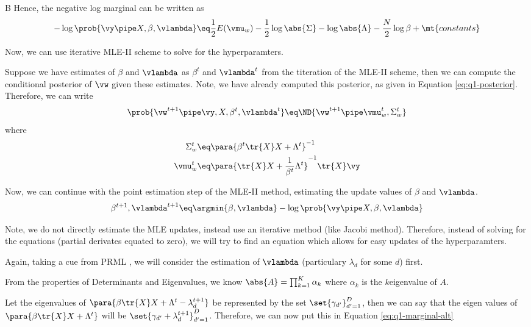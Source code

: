 \documentclass{article}
\begin{document}
\begin{question}
\begin{qpart}{B}
		Hence, the negative log marginal can be written as
		\begin{equation}
			- \log{\prob{\vy \pipe X, \beta, \vlambda}}	\eq	\frac{1}{2}  E(\vmu_w) - \frac{1}{2} \log{\abs{\Sigma}}- \log{\abs{\Lambda}} - \frac{N}{2} \log{\beta} + \mt{constants}
			\label{eq:q1-marginal-alt}
		\end{equation}

		Now, we can use iterative MLE-II scheme to solve for the hyperparamters.

		Suppose we have estimates of $\beta$ and $\vlambda$ as $\beta^t$ and $\vlambda^t$ from the t\tth iteration of the MLE-II scheme, then we can compute the conditional posterior of $\vw$ given these estimates. Note, we have already computed this posterior, as given in Equation \ref{eq:q1-posterior}. Therefore, we can write
		\begin{align*}
			\prob{\vw^{t + 1} \pipe \vy, X, \beta^t, \vlambda^t}	\eq	\ND{\vw^{t + 1} \pipe \vmu_w^t, \Sigma_w^t}
		\end{align*}
		where
		\begin{align*}
			\Sigma_w^t	&\eq	\para{\beta^t \tr{X} X + \Lambda^t}^{-1} \\
			\vmu_w^t	&\eq	\para{\tr{X} X + \frac{1}{\beta^t} \Lambda^t}^{-1} \tr{X} \vy
		\end{align*}

		Now, we can continue with the point estimation step of the MLE-II method, \ie estimating the update values of $\beta$ and $\vlambda$.
		\begin{align*}
			\beta^{t + 1}, \vlambda^{t + 1}	\eq	\argmin{\beta, \vlambda} - \log{\prob{\vy \pipe X, \beta, \vlambda}}
		\end{align*}

		Note, we do not directly estimate the MLE updates, instead use an iterative method (like Jacobi method). Therefore, instead of solving for the equations (partial derivates equated to zero), we will try to find an equation which allows for easy updates of the hyperparamters.

		Again, taking a cue from PRML \cite{prml}, we will consider the estimation of $\vlambda$ (particulary $\lambda_d$ for some $d$) first.

		From the properties of Determinants and Eigenvalues, we know $\abs{A} = \prod_{k = 1}^K \alpha_k$ where $\alpha_k$ is the $k$\tth eigenvalue of $A$.

		Let the eigenvalues of $\para{\beta \tr{X} X + \Lambda^t - \lambda_d^{t + 1}}$ be represented by the set $\set{\gamma_{d'}}_{d' = 1}^D$, then we can say that the eigen values of $\para{\beta \tr{X} X + \Lambda^t}$ will be $\set{\gamma_{d'} + \lambda_d^{t + 1}}_{d' = 1}^D$. Therefore, we can now put this in Equation \ref{eq:q1-marginal-alt}


\end{qpart}
\end{question}
\end{document}
